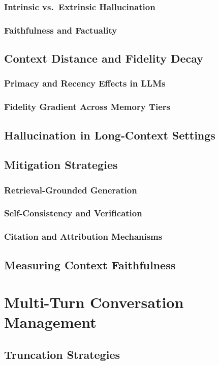 \documentclass[12pt, letterpaper]{article}
\begin{document}
\subsubsection{Intrinsic vs.\ Extrinsic Hallucination}
\subsubsection{Faithfulness and Factuality}
\subsection{Context Distance and Fidelity Decay}
\subsubsection{Primacy and Recency Effects in LLMs}
\subsubsection{Fidelity Gradient Across Memory Tiers}
\subsection{Hallucination in Long-Context Settings}
\subsection{Mitigation Strategies}
\subsubsection{Retrieval-Grounded Generation}
\subsubsection{Self-Consistency and Verification}
\subsubsection{Citation and Attribution Mechanisms}
\subsection{Measuring Context Faithfulness}

\section{Multi-Turn Conversation Management}
\subsection{Truncation Strategies}
\end{document}
